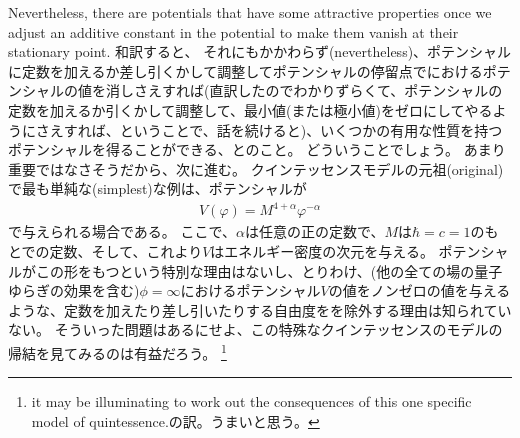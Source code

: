 \documentclass[11pt]{ltjsarticle}
\theoremstyle{plain}
\theoremstyle{break}
\begin{document}
Nevertheless, there are potentials that have some attractive properties once we adjust an additive constant in the potential to make them vanish at their stationary point.
和訳すると、
それにもかかわらず(nevertheless)、ポテンシャルに定数を加えるか差し引くかして調整してポテンシャルの停留点でにおけるポテンシャルの値を消しさえすれば(直訳したのでわかりずらくて、ポテンシャルの定数を加えるか引くかして調整して、最小値(または極小値)をゼロにしてやるようにさえすれば、ということで、話を続けると)、いくつかの有用な性質を持つポテンシャルを得ることができる、とのこと。
どういうことでしょう。
あまり重要ではなさそうだから、次に進む。
クインテッセンスモデルの元祖(original)で最も単純な(simplest)な例は、ポテンシャルが
\begin{align}
  V(\varphi)=M^{4+\alpha} \varphi^{-\alpha} \label{eq:1.12.5}
\end{align}%
で与えられる場合である。
ここで、$\alpha$は任意の正の定数で、$M$は$\hbar = c = 1$のもとでの定数、そして、これより$V$はエネルギー密度の次元を与える。
ポテンシャルがこの形をもつという特別な理由はないし、とりわけ、(他の全ての場の量子ゆらぎの効果を含む)$\phi = \infty$におけるポテンシャル$V$の値をノンゼロの値を与えるような、定数を加えたり差し引いたりする自由度をを除外する理由は知られていない。
そういった問題はあるにせよ、この特殊なクインテッセンスのモデルの帰結を見てみるのは有益だろう。
\footnote{ it may be illuminating to work out the consequences of this one specific model of quintessence.の訳。うまいと思う。}
\end{document}
